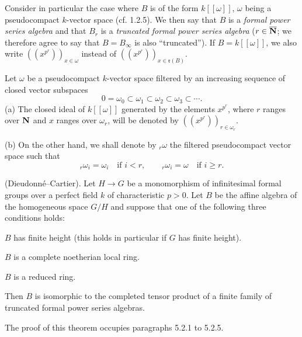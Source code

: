 Consider in particular the case where $B$ is of the form $k[[\omega]]$, $\omega$ being a pseudocompact $k$-vector space (cf. 1.2.5). We then say that $B$ is a \emph{formal power series algebra} and that $B_r$ is a \emph{truncated formal power series algebra} ($r\in\overline{\mathbf{N}}$; we therefore agree to say that $B=B_\infty$ is also ``truncated''). If $B=k[[\omega]]$, we also write $((x^{p^r}))_{x\in\omega}$ instead of $((x^{p^r}))_{x\in\mathfrak r(B)}$.
\begin{notation}{}
Let $\omega$ be a pseudocompact $k$-vector space filtered by an increasing sequence of closed vector subspaces
\[
0=\omega_0\subset\omega_1\subset\omega_2\subset\omega_3\subset\cdots.
\]
(a) The closed ideal of $k[[\omega]]$ generated by the elements $x^{p^r}$, where $r$ ranges over $\mathbf{N}$ and $x$ ranges over $\omega_r$, will be denoted by $((x^{p^r}))_{r\in\omega_r}$.

(b) On the other hand, we shall denote by ${}_r\omega$ the filtered pseudocompact vector space such that
\[
{}_r\omega_i=\omega_i\quad\text{if }i<r,\qquad{}_r\omega_i=\omega\quad\text{if }i\ge r.
\]
\end{notation}
\begin{theorem}{}\label{VIIB.5.2}\textup{(Dieudonné--Cartier).}
Let $H\to G$ be a monomorphism of infinitesimal formal groups over a perfect field $k$ of characteristic $p>0$. Let $B$ be the affine algebra of the homogeneous space $G/H$ and suppose that one of the following three conditions holds:
\begin{enumeratei}
\item $B$ has finite height (this holds in particular if $G$ has finite height).
\item $B$ is a complete noetherian local ring.
\item $B$ is a reduced ring.
\end{enumeratei}
Then $B$ is isomorphic to the completed tensor product of a finite family of truncated formal power series algebras.
\end{theorem}
The proof of this theorem occupies paragraphs 5.2.1 to 5.2.5.

